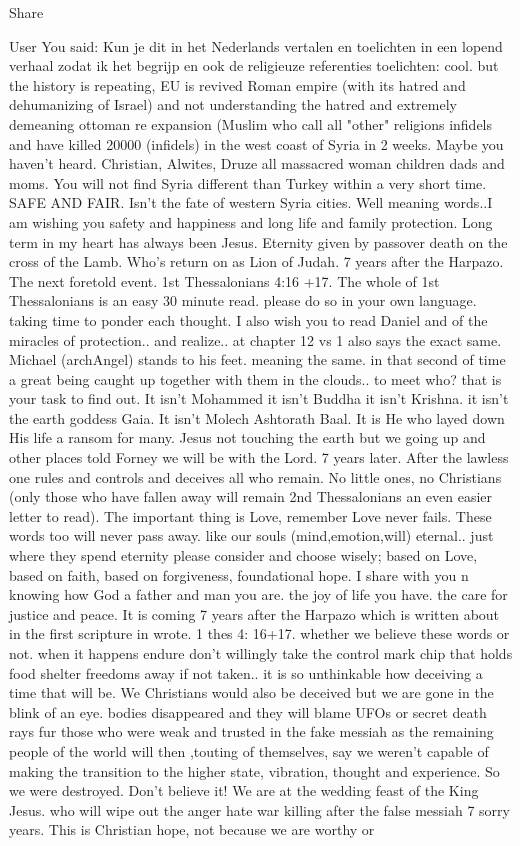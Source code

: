 Share

User
You said:
Kun je dit in het Nederlands vertalen en toelichten in een lopend verhaal zodat ik het begrijp en ook de religieuze referenties toelichten: cool. but the history is repeating, EU is revived Roman empire (with its hatred and dehumanizing of Israel) and not understanding the hatred and extremely demeaning ottoman re expansion (Muslim who call all "other" religions infidels and have killed 20000 (infidels) in the west coast of Syria in 2 weeks. Maybe you haven't heard.  Christian, Alwites, Druze  all massacred woman children dads and moms.  You will not find Syria different than Turkey within a very short time.  SAFE AND FAIR.  Isn't the fate of western Syria cities. Well meaning words..I am wishing you safety and happiness and long life and family protection. Long term in my heart has always been Jesus.  Eternity given by passover death on the cross of the Lamb.  Who's return on as Lion of Judah. 7 years after the Harpazo. The next foretold event.  1st Thessalonians 4:16 +17.  The whole of 1st Thessalonians is an easy 30 minute read.  please do so in your own language.  taking time to ponder each thought.  I also wish you to read Daniel and of the miracles of protection.. and realize.. at chapter 12 vs 1 also says the exact same.  Michael (archAngel) stands to his feet.  meaning the same.  in that second of time a great being caught up together with them in the clouds.. to meet who? that is your task to find out.  It isn't Mohammed it isn't Buddha it isn't Krishna. it isn't the earth goddess Gaia. It isn't Molech Ashtorath Baal. It is He who layed down His life a ransom for many. Jesus not touching the earth but we going up and other places told Forney we will be with the Lord. 7 years later.  After the lawless one rules and controls and deceives all who remain.  No little ones, no Christians (only those who have fallen away will remain 2nd Thessalonians an even easier letter to read). The important thing is Love, remember Love never fails.  These words too will never pass away.  like our souls (mind,emotion,will) eternal.. just where they spend eternity please consider and choose wisely; based on Love, based on faith, based on forgiveness, foundational hope. I share with you n knowing how God a father and man you are. the joy of life you have.  the care for justice and peace.  It is coming 7 years after the Harpazo which is written about in the first scripture in wrote.  1 thes 4: 16+17. whether we believe these words or not.  when it happens endure don't willingly take the control mark chip that holds food shelter freedoms away if not taken.. it is so unthinkable how deceiving a time that will be. We Christians would also be deceived but we are gone in the blink of an eye.  bodies disappeared and they will blame UFOs or secret death rays fur those who were weak and trusted in the fake messiah as the remaining people of the world will then ,touting of themselves, say we weren't capable of making the transition to the higher state, vibration, thought and experience. So we were destroyed.  Don't believe it!  We are at the wedding feast of the King Jesus.  who will wipe out the anger hate war killing after the false messiah  7 sorry years. This is Christian hope,  not because we are worthy or 